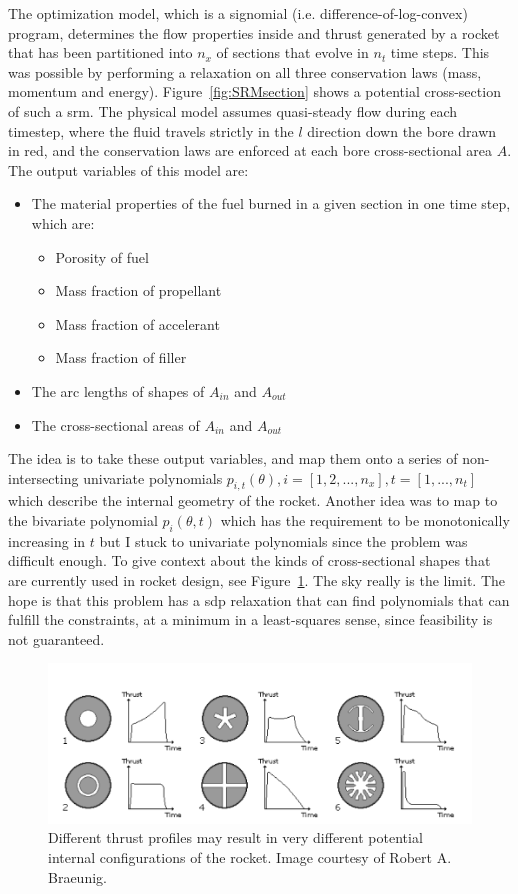 The optimization model, which is a signomial (i.e. difference-of-log-convex) program, determines the
flow properties inside and thrust generated by a rocket that has
been partitioned into $n_x$ of sections that evolve in $n_t$ time steps.
This was possible by performing a relaxation on all three conservation
laws (mass, momentum and energy).
Figure~\ref{fig:SRMsection} shows a potential cross-section of such a \gls{srm}.
The physical model assumes quasi-steady flow during each timestep, where the fluid travels strictly
in the $l$ direction down the bore drawn in red, and the conservation laws are enforced at
each bore cross-sectional area $A$. The output variables of this model are:
\begin{itemize}
    \item The material properties of the fuel burned in a given section in one time step, which are:
    \begin{itemize}
        \item Porosity of fuel
        \item Mass fraction of propellant
        \item Mass fraction of accelerant
        \item Mass fraction of filler
    \end{itemize}
    \item The arc lengths of shapes of $A_{in}$ and $A_{out}$
    \item The cross-sectional areas of $A_{in}$ and $A_{out}$
\end{itemize}

The idea is to take these output variables, and map them onto a series of
non-intersecting univariate polynomials $p_{i,t}(\theta), i = [1,2,...,n_x], t = [1,...,n_t]$
which describe the internal geometry of the rocket.
Another idea was to map to the bivariate polynomial $p_i(\theta,t)$
which has the requirement to be monotonically increasing in $t$
but I stuck to univariate polynomials since the problem
was difficult enough.
To give context about the kinds of cross-sectional shapes that are currently used in rocket design,
see Figure~\ref{fig:potentialShapes}. The sky really is the limit.
The hope is that this problem has a \gls{sdp} relaxation that can find
polynomials that can fulfill the constraints, at a minimum in a least-squares sense,
since feasibility is not guaranteed.

\begin{figure}[h]
    \begin{center}
        \includegraphics[width=0.7\linewidth]{figures/potentialShapes.png}
        \caption{Different thrust profiles may result in very different potential internal configurations of the rocket.
        Image courtesy of Robert A. Braeunig.}
        \label{fig:potentialShapes}
    \end{center}
\end{figure}
